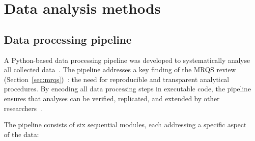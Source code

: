 \section{Data analysis methods} \label{sec:data-analysis}

\subsection{Data processing pipeline}

A Python-based data processing pipeline was developed to systematically analyse all collected data~\cite{creswell, ary}. The pipeline addresses a key finding of the MRQS review (Section~\ref{sec:mrqs})~\cite{Korniienko2025mrqs}: the need for reproducible and transparent analytical procedures. By encoding all data processing steps in executable code, the pipeline ensures that analyses can be verified, replicated, and extended by other researchers~\cite{KitchenhamCharters2007}.

The pipeline consists of six sequential modules, each addressing a specific aspect of the data:

